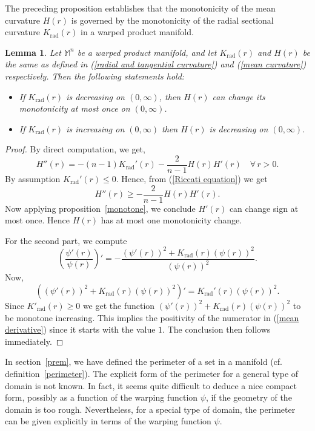 \documentclass[a4paper,11pt,reqno]{amsart}
\renewcommand\eqref[1]{(\ref{#1})}
\theoremstyle{plain}
\newtheorem{lemma}{Lemma}[section]
\numberwithin{equation}{section} \allowdisplaybreaks
\newcommand{\m}{\mathbb{M}^n}
\begin{document}
The preceding proposition establishes that the monotonicity of the mean curvature $H(r)$ is governed by the monotonicity of the radial sectional curvature $K_{\text{rad}}(r)$ in a warped product manifold.
\begin{lemma}\label{radial to mean}
    Let $\m$ be a warped product manifold, and let $K_{\text{rad}}(r)$ and $H(r)$ be the same as defined in \eqref{radial and tangential curvature} and \eqref{mean curvature} respectively. Then the following statements hold:
    \begin{itemize}
        \item[(i)] If $K_{\text{rad}}(r)$ is decreasing on $(0,\infty)$, then $H(r)$ can change its monotonicity at most once on $(0,\infty)$. 
        \medskip
        \item[(ii)] If $K_{\text{rad}}(r)$ is increasing on $(0,\infty)$ then $H(r)$ is decreasing on $(0,\infty)$.
    \end{itemize}
\end{lemma}
\begin{proof}
    By direct computation, we get,
    \begin{equation}\label{Riccati equation}
       H''(r)= -(n-1)K_{\text{rad}}'(r)-\frac{2}{n-1}H(r)H'(r)\quad \forall\, r>0 .
    \end{equation}
By assumption $K_{\text{rad}}'(r)\leq 0$. Hence, from \eqref{Riccati equation} we get
\begin{equation*}
    H''(r) \geq -\frac{2}{n-1}H(r)H'(r).
\end{equation*}
Now applying proposition~\ref{monotone}, we conclude $H'(r)$ can change sign at most once. Hence $H(r)$ has at most one monotonicity change.\par
For the second part, we compute
\begin{equation}\label{mean derivative}
    \left(\frac{\psi'(r)}{\psi(r)}\right)'=-\frac{(\psi'(r))^2+K_{\text{rad}}(r)(\psi(r))^2}{(\psi(r))^2}.
\end{equation}
Now,
\begin{equation*}
    ((\psi'(r))^2+K_{\text{rad}}(r)(\psi(r))^2)'=K_{\text{rad}}'(r)(\psi(r))^2.
\end{equation*}
Since $K'_{\text{rad}}(r)\geq 0$ we get the function $(\psi'(r))^2+K_{\text{rad}}(r)(\psi(r))^2$ to be monotone increasing. This implies the positivity of the numerator in \eqref{mean derivative} since it starts with the value $1$. The conclusion then follows immediately.
\end{proof}
\medskip
In section~\ref{prem}, we have defined the perimeter of a set in a manifold (cf. definition~\ref{perimeter}). The explicit form of the perimeter for a general type of domain is not known. In fact, it seems quite difficult to deduce 
a nice compact form, possibly as a function of the warping function $\psi$, if the geometry of the domain is too rough. Nevertheless, for a special type of domain, the perimeter can be given explicitly in terms of the warping function $\psi$.
\end{document}
